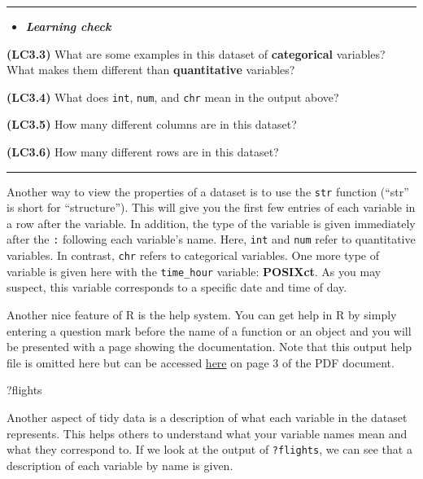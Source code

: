 \documentclass[]{tufte-book}
\newenvironment{Shaded}{\begin{snugshade}}{\end{snugshade}}
\newcommand{\NormalTok}[1]{{#1}}
\newenvironment{rmdblock}[1]
  {\begin{shaded*}
  \begin{itemize}
  \renewcommand{\labelitemi}{
    \raisebox{-.7\height}[0pt][0pt]{
    }
  }
  \item
  }
  {
  \end{itemize}
  \end{shaded*}
  }
\newenvironment{learncheck}
  {\begin{rmdblock}{warning}}
  {\end{rmdblock}}
\begin{document}
\begin{center}\rule{\linewidth}{\linethickness}\end{center}

\begin{learncheck}
\textbf{\emph{Learning check}}
\end{learncheck}

\textbf{(LC3.3)} What are some examples in this dataset of
\textbf{categorical} variables? What makes them different than
\textbf{quantitative} variables?

\textbf{(LC3.4)} What does \texttt{int}, \texttt{num}, and \texttt{chr}
mean in the output above?

\textbf{(LC3.5)} How many different columns are in this dataset?

\textbf{(LC3.6)} How many different rows are in this dataset?

\begin{center}\rule{\linewidth}{\linethickness}\end{center}

Another way to view the properties of a dataset is to use the
\texttt{str} function (``str'' is short for ``structure''). This will
give you the first few entries of each variable in a row after the
variable. In addition, the type of the variable is given immediately
after the \texttt{:} following each variable's name. Here, \texttt{int}
and \texttt{num} refer to quantitative variables. In contrast,
\texttt{chr} refers to categorical variables. One more type of variable
is given here with the \texttt{time\_hour} variable: \textbf{POSIXct}.
As you may suspect, this variable corresponds to a specific date and
time of day.

Another nice feature of R is the help system. You can get help in R by
simply entering a question mark before the name of a function or an
object and you will be presented with a page showing the documentation.
Note that this output help file is omitted here but can be accessed
\href{https://cran.r-project.org/web/packages/nycflights13/nycflights13.pdf}{here}
on page 3 of the PDF document.

\begin{Shaded}
\begin{Highlighting}[]
\NormalTok{?flights}
\end{Highlighting}
\end{Shaded}

Another aspect of tidy data is a description of what each variable in
the dataset represents. This helps others to understand what your
variable names mean and what they correspond to. If we look at the
output of \texttt{?flights}, we can see that a description of each
variable by name is given.
\end{document}
